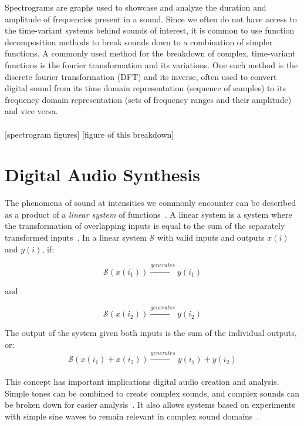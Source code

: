 \documentclass[\main/thesis.tex]{subfiles}
\begin{document}
Spectrograms are graphs used to showcase and analyze the duration and amplitude of frequencies present in a sound. Since we often do not have access to the time-variant systems behind sounds of interest, it is common to use function decomposition methods to break sounds down to a combination of simpler functions. A commonly used method for the breakdown of complex, time-variant functions is the fourier transformation and its variations. One such method is the discrete fourier transformation (DFT) and its inverse, often used to convert digital sound from its time domain representation (sequence of samples) to its frequency domain representation (sets of frequency ranges and their amplitude) and vice versa.\\\\

[spectrogram figures]
[figure of this breakdown]



\section{Digital Audio Synthesis}
\label{sec_digital_synthesis}
The phenomena of sound at intensities we commonly encounter can be described as a product of a \textit{linear system} of functions~\cite{cook1999chap4}. A linear system is a system where the transformation of overlapping inputs is equal to the sum of the separately transformed inputs~\cite{lyons2004understandingChap1,cook1999chap4}. In a linear system $\mathcal{S}$ with valid inputs and outputs $x(i)$ and $y(i)$, if:

\begin{equation}
 \mathcal{S}(x(i_1)) \xrightarrow{generates} y(i_1)
\end{equation}
\begin{center}
    and
\end{center}
\begin{equation}
\mathcal{S}(x(i_2)) \xrightarrow{generates}y(i_2)
\end{equation}

The output of the system given both inputs is the sum of the individual outputs, or:
\begin{equation}
 \mathcal{S}(x(i_1)+x(i_2)) \xrightarrow{generates} y(i_1)+y(i_2) 
\end{equation}
\\
This concept has important implications digital audio creation and analysis. Simple tones can be combined to create complex sounds, and complex sounds can be broken down for easier analysis~\cite{lyons2004understandingChap1}. It also allows systems based on experiments with simple sine waves to remain relevant in complex sound domains~\cite{cook1999chap4}.  \\\\
\end{document}
